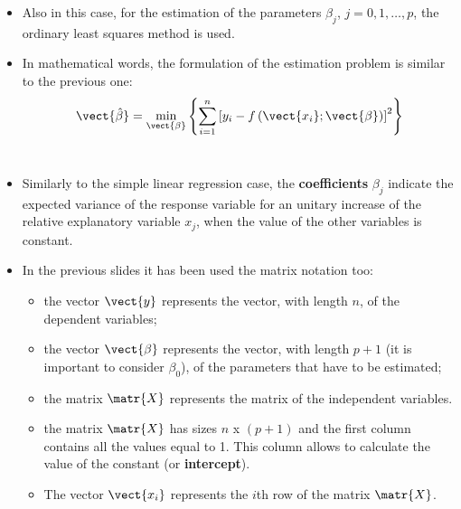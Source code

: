 \begin{frame}
  \vspace{0.25cm}
  \begin{itemize}
    \item Also in this case, for the estimation of the parameters $ \beta_j $, $ j = 0, 1, \dots, p $, the ordinary least squares method is used.
    \vspace{0.5cm}
    \item In mathematical words, the formulation of the estimation problem is similar to the previous one:
    \vspace{-0.3cm} $$\vect{\hat{\beta}} = \min_{\vect{\beta}}\left\lbrace \sum_{i=1}^{n}{\left[ y_i - f\left( \vect{x_i}; \vect{\beta} \right) \right]^2 }\right\rbrace $$\\
    \vspace{0.4cm}
    \item Similarly to the simple linear regression case, the \textbf{coefficients} $ \beta_j $ indicate the expected variance of the response variable for an unitary increase of the relative explanatory variable $ x_j $, when the value of the other variables is constant.
  \end{itemize}
\end{frame}

\begin{frame}
  \vspace{0.25cm}
  \begin{itemize}
    \item In the previous slides it has been used the matrix notation too:
    \vspace{0.25cm}
    \begin{itemize}
      \item the vector $ \vect{y} $ represents the vector, with length $ n $, of the dependent variables;
      \vspace{0.25cm}
      \item the vector $ \vect{\beta} $ represents the vector, with length $ p + 1 $ (it is important to consider $ \beta_0 $), of the parameters that have to be estimated;
      \vspace{0.25cm}
      \item the matrix $ \matr{X} $ represents the matrix of the independent variables. 
      \vspace{0.25cm}
      \item the matrix $ \matr{X} $ has sizes $ n $ x $ (p + 1) $ and the first column contains all the values equal to 1. This column allows to calculate the value of the constant (or \textbf{intercept}).
      \vspace{0.25cm}
      \item The vector $ \vect{x_i} $ represents the $ i $th row of the matrix $ \matr{X} $.
    \end{itemize}
  \end{itemize}
\end{frame}

